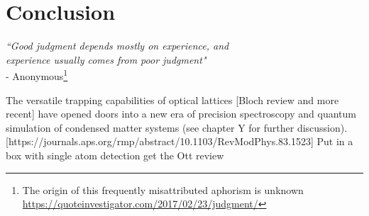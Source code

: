 
\chapter{Conclusion}

\begin{flushright}
\emph{``Good judgment depends mostly on experience, and\\ experience usually comes from poor judgment"} \\- Anonymous\footnote{The origin of this frequently misattributed aphorism is unknown \url{https://quoteinvestigator.com/2017/02/23/judgment/}}
\end{flushright}



	 
	
	The versatile trapping capabilities of optical lattices [Bloch review and more recent] have opened doors into a new era of precision spectroscopy and quantum simulation of condensed matter systems (see chapter Y for further discussion). [https://journals.aps.org/rmp/abstract/10.1103/RevModPhys.83.1523]
	Put in a box with single atom detection
		get the Ott review
		
